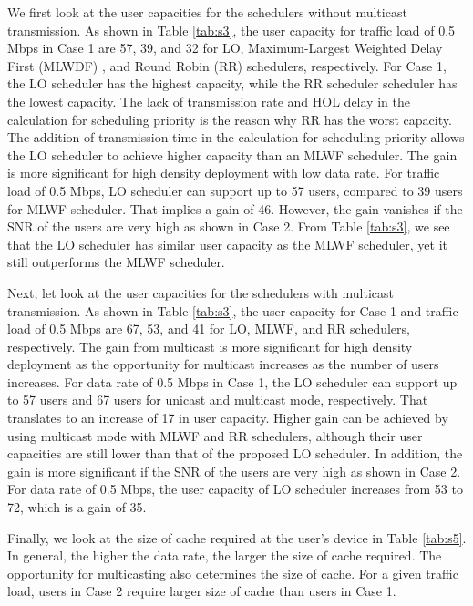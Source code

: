 \documentclass[conference]{IEEEtran}
\newcommand{\0}{\vect{0}}
\newcommand{\1}{\vect{1}}
\begin{document}
We first look at the user capacities for the schedulers without multicast transmission. As shown in Table \ref{tab:s3}, the user capacity for traffic load of 0.5 Mbps in Case 1 are 57, 39, and 32 for LO,  Maximum-Largest Weighted Delay First (MLWDF)  \cite{Sto01AP}, and Round Robin (RR) schedulers, respectively. For Case 1, the LO scheduler has the highest capacity, while the RR scheduler scheduler has the lowest capacity. The lack of transmission rate and HOL delay in the calculation for scheduling priority is the reason why RR has the worst capacity. The addition of transmission time in the calculation for scheduling priority allows the LO scheduler to achieve higher capacity than an MLWF scheduler. The gain is more significant for high density deployment with low data rate. For traffic load of 0.5 Mbps, LO scheduler can support up to 57 users, compared to 39 users for  MLWF scheduler. That implies a gain of 46. However, the gain vanishes if the SNR of the users are very high as shown in Case 2. From Table \ref{tab:s3}, we see that the LO scheduler has similar user capacity as the MLWF scheduler, yet it still outperforms the MLWF scheduler.


Next, let look at the user capacities for the schedulers with multicast transmission. As shown in Table \ref{tab:s3}, the user capacity for Case 1 and traffic load of 0.5 Mbps are 67, 53, and 41 for LO, MLWF, and RR schedulers, respectively. The gain from multicast  is more significant for high density deployment as the opportunity for multicast increases as the number of users increases. For data rate of 0.5 Mbps in Case 1, the LO scheduler can support up to 57 users and 67 users for unicast and  multicast mode, respectively. That translates to an increase of 17 in user capacity. Higher gain can be achieved by using multicast mode with MLWF and RR schedulers, although their user capacities are still lower than that of the proposed LO scheduler. In addition, the gain is more significant if the SNR of the users are very high as shown in Case 2. For data rate of 0.5 Mbps, the user capacity of  LO scheduler increases from 53 to 72, which is a gain of 35.

Finally, we look at the size of cache required at the user's device in Table \ref{tab:s5}. In general, the higher the data rate, the larger the size of cache required. The opportunity for multicasting also determines the size of cache. For a given traffic load, users in Case 2 require larger size of cache than users in Case 1.
\end{document}
